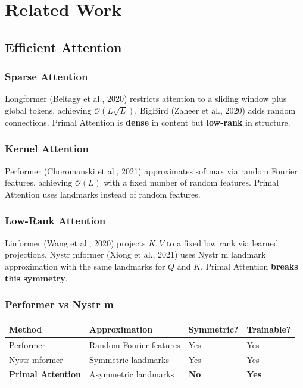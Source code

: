 
\section{Related Work}

\subsection{Efficient Attention}

\subsubsection{Sparse Attention}

Longformer (Beltagy et al., 2020) restricts attention to a sliding window 
plus global tokens, achieving $\mathcal{O}(L \sqrt{L})$. BigBird (Zaheer et 
al., 2020) adds random connections. Primal Attention is \textbf{dense} in content 
but \textbf{low-rank} in structure.

\subsubsection{Kernel Attention}

Performer (Choromanski et al., 2021) approximates softmax via random Fourier 
features, achieving $\mathcal{O}(L)$ with a fixed number of random features. 
Primal Attention uses landmarks instead of random features.

\subsubsection{Low-Rank Attention}

Linformer (Wang et al., 2020) projects $K, V$ to a fixed low rank via learned 
projections. Nystr mformer (Xiong et al., 2021) uses Nystr m landmark 
approximation with the same landmarks for $Q$ and $K$. Primal Attention 
\textbf{breaks this symmetry}.

\subsubsection{Performer vs Nystr m}

\begin{table}[H]
\centering
\small
\begin{tabular}{llll}
\toprule
\textbf{Method} & \textbf{Approximation} & \textbf{Symmetric?} & \textbf{Trainable?} \\
\midrule
Performer & Random Fourier features & Yes & Yes \\
Nystr mformer & Symmetric landmarks & Yes & Yes \\
\textbf{Primal Attention} & Asymmetric landmarks & \textbf{No} & \textbf{Yes} \\
\bottomrule
\end{tabular}
\end{table}

